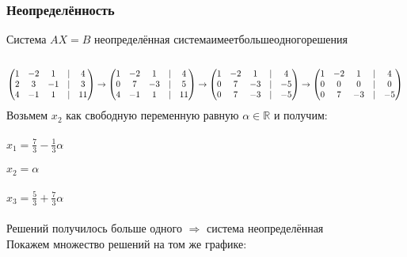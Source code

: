 \documentclass{article}
\begin{document}
    \subsubsection{Неопределённость}
    Система $AX = B$ неопределённая \iff $система имеет больше одного решения$ \\ \\
    \[
    \begin{pmatrix}  
        1 &	-2 & 1 & | & 4 \\ 
        2 &	3 &	-1 & | & 3 \\
        4 &	-1 & 1 & | & 11 \\
    \end{pmatrix}
    \to
    \begin{pmatrix}  
        1 &	-2 & 1 & | & 4 \\ 
        0 &	7 &	-3 & | & 5 \\
        4 &	-1 & 1 & | & 11 \\
    \end{pmatrix}
    \to
    \begin{pmatrix}  
        1 &	-2 & 1 & | & 4 \\ 
        0 &	7 &	-3 & | & -5 \\
        0 &	7 & -3 & | & -5 \\
    \end{pmatrix}
    \to
    \begin{pmatrix}  
        1 &	-2 & 1 & | & 4 \\
        0 &	0 & 0 & | & 0 \\
        0 &	7 &	-3 & | & -5 \\
    \end{pmatrix} \\ \\ \\
    \] 
    Возьмем $x_2$ как свободную переменную равную $\alpha \in \mathbb{R}$ и получим: \\ \\
    $x_1 = \frac{7}{3}-\frac{1}{3}\alpha$ \\ \\
    $x_2 = \alpha$ \\ \\
    $x_3 = \frac{5}{3} + \frac{7}{3}\alpha$ \\ \\
    Решений получилось больше одного $\Rightarrow$ система неопределённая \\
    Покажем множество решений на том же графике: \\ \\
\end{document}
